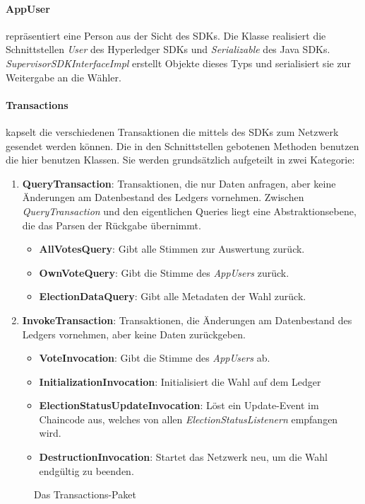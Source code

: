 \documentclass[parskip=full]{scrartcl}
\newcommand{\fakeparagraph}[1]{\textbf{#1}}
\begin{document}
	\paragraph{AppUser} repräsentiert eine Person aus der Sicht des SDKs. Die Klasse realisiert die Schnittstellen \textit{User} des Hyperledger SDKs und \textit{Serializable} des Java SDKs. \textit{SupervisorSDKInterfaceImpl} erstellt Objekte dieses Typs und serialisiert sie zur Weitergabe an die Wähler.
	\begin{samepage}
	\paragraph{Transactions} kapselt die verschiedenen Transaktionen die mittels des SDKs zum Netzwerk gesendet werden können. Die in den Schnittstellen gebotenen Methoden benutzen die hier benutzen Klassen. Sie werden grundsätzlich aufgeteilt in zwei Kategorie:
	\begin{enumerate}
			\item\fakeparagraph{QueryTransaction}: Transaktionen, die nur Daten anfragen, aber keine Änderungen am Datenbestand des Ledgers vornehmen. Zwischen \textit{QueryTransaction} und den eigentlichen Queries liegt eine Abstraktionsebene, die das Parsen der Rückgabe übernimmt.
			\begin{itemize}
				\item \fakeparagraph{AllVotesQuery}: Gibt alle Stimmen zur Auswertung zurück.
				\item \fakeparagraph{OwnVoteQuery}: Gibt die Stimme des \textit{AppUsers} zurück.
				\item \fakeparagraph{ElectionDataQuery}: Gibt alle Metadaten der Wahl zurück.
			\end{itemize}
			\item \fakeparagraph{InvokeTransaction}: Transaktionen, die Änderungen am Datenbestand des Ledgers vornehmen, aber keine Daten zurückgeben.
			\begin{itemize}
				\item \fakeparagraph{VoteInvocation}: Gibt die Stimme des \textit{AppUsers} ab.
				\item \fakeparagraph{InitializationInvocation}: Initialisiert die Wahl auf dem Ledger
				\item \fakeparagraph{ElectionStatusUpdateInvocation}: Löst ein Update-Event im Chaincode aus, welches von allen \textit{ElectionStatusListenern} empfangen wird.
				\item \fakeparagraph{DestructionInvocation}: Startet das Netzwerk neu, um die Wahl endgültig zu beenden.
			\end{itemize}
	\end{enumerate}
	\begin{sidewaysfigure}[!h]
		\centering
		
		\caption{Das Transactions-Paket}
	\end{sidewaysfigure}
	\end{samepage}
\end{document}
